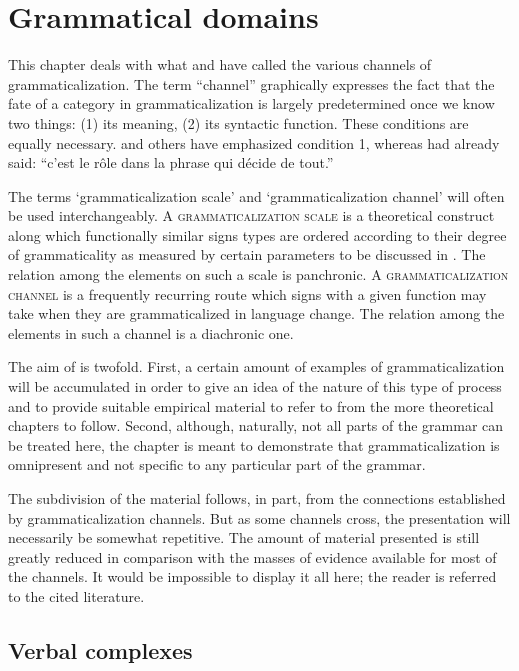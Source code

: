 \chapter{Grammatical domains} \label{chap:3}

This chapter deals with what \citet{Givón1979b} and \citet{HeineEtAl1984} have called the various channels of grammaticalization. The term ``channel'' graphically expresses the fact that the fate of a category in grammaticalization is largely predetermined once we know two things: (1) its meaning, (2) its syntactic function. These conditions are equally necessary. \citet[213f]{Givón1979a} and others have emphasized condition 1, whereas \citet[170]{Meillet1915} had already said: “c'est le rôle dans la phrase qui décide de tout.”

The terms ‘grammaticalization scale’ and ‘grammaticalization channel’ will often be used interchangeably. A \textsc{grammaticalization scale} is a theoretical construct along which functionally similar signs types are ordered according to their degree of grammaticality as measured by certain parameters to be discussed in . The relation among the elements on such a scale is panchronic. A \textsc{grammaticalization channel} is a frequently recurring route which signs with a given function may take when they are grammaticalized in language change. The relation among the elements in such a channel is a diachronic one.

The aim of  is twofold. First, a certain amount of examples of grammaticalization will be accumulated in order to give an idea of the nature of this type of process and to provide suitable empirical material to refer to from the more theoretical chapters to follow. Second, although, naturally, not all parts of the grammar can be treated here, the chapter is meant to demonstrate that grammaticalization is omnipresent and not specific to any particular part of the grammar.

The subdivision of the material follows, in part, from the connections established by grammaticalization channels. But as some channels cross, the presentation will necessarily be somewhat repetitive. The amount of material presented is still greatly reduced in comparison with the masses of evidence available for most of the channels. It would be impossible to display it all here; the reader is referred to the cited literature.

\section{Verbal complexes}

